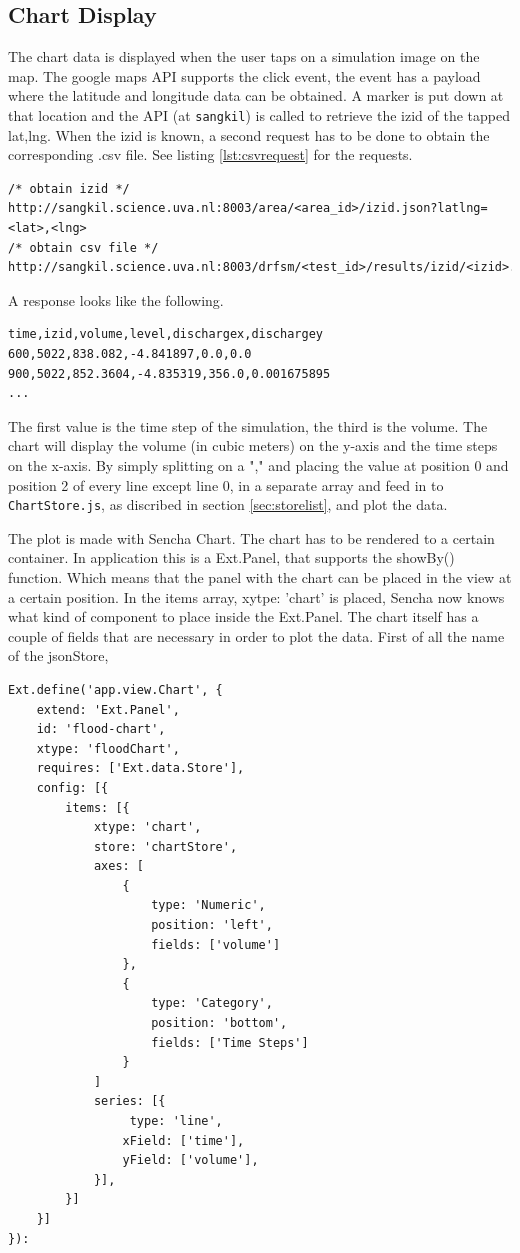 \subsection{Chart Display}
The chart data is displayed when the user taps on a simulation image on the map. The google maps API supports the click event, the event has a payload where the latitude and longitude data can be obtained. A marker is put down at that location and the API (at \texttt{sangkil}) is called to retrieve the izid of the tapped lat,lng. When the izid is known, a second request has to be done to obtain the corresponding .csv file. See listing \ref{lst:csvrequest} for the requests.

\begin{lstlisting}[caption={requests for flood data}, label={lst:csvrequests}]
/* obtain izid */
http://sangkil.science.uva.nl:8003/area/<area_id>/izid.json?latlng=<lat>,<lng> 
/* obtain csv file */
http://sangkil.science.uva.nl:8003/drfsm/<test_id>/results/izid/<izid>.csv 
\end{lstlisting}
 
A response looks like the following.
\begin{lstlisting}[caption={csv response}, label={lst:csvresponse}]
time,izid,volume,level,dischargex,dischargey
600,5022,838.082,-4.841897,0.0,0.0
900,5022,852.3604,-4.835319,356.0,0.001675895
...
\end{lstlisting}
The first value is the time step of the simulation, the third is the volume. The chart will display the volume (in cubic meters) on the y-axis and the time steps on the x-axis. By simply splitting on a "," and placing the value at position 0 and position 2 of every line except line 0, in a separate array and feed in to \texttt{ChartStore.js}, as discribed in section \ref{sec:storelist}, and plot the data.

The plot is made with Sencha Chart. The chart has to be rendered to a certain container. In application this is a Ext.Panel, that supports the showBy() function. Which means that the panel with the chart can be placed in the view at a certain position. In the items array, xytpe: 'chart' is placed, Sencha now knows what kind of component to place inside the Ext.Panel. The chart itself has a couple of fields that are necessary in order to plot the data. First of all the name of the jsonStore,


\begin{lstlisting}[caption=Chart component app/view/Chart.js, label="chartcomponent" ]
Ext.define('app.view.Chart', {
	extend: 'Ext.Panel',
    id: 'flood-chart',
	xtype: 'floodChart',
    requires: ['Ext.data.Store'],
    config: [{
    	items: [{
			xtype: 'chart',
			store: 'chartStore',
			axes: [
				{
					type: 'Numeric',
					position: 'left',
					fields: ['volume']
				},
				{
					type: 'Category',
					position: 'bottom',
					fields: ['Time Steps']
				}			
			]
			series: [{
				 type: 'line',
                xField: ['time'],
                yField: ['volume'],
            }],
    	}]
    }]
}):
\end{lstlisting}

